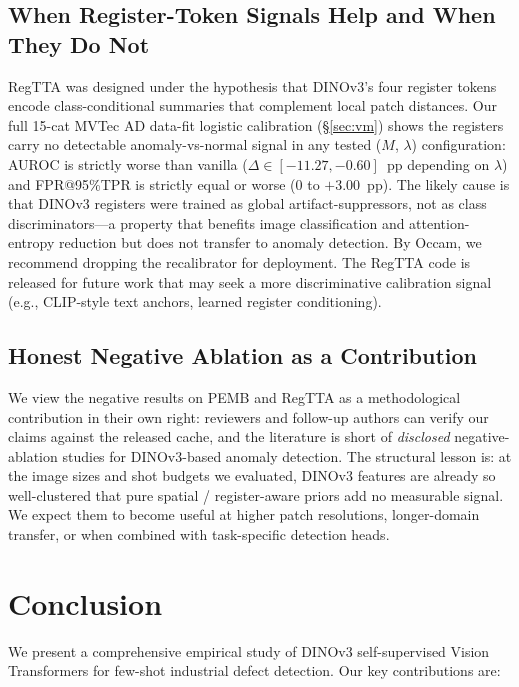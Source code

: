 \documentclass[journal]{IEEEtran}
\begin{document}
\subsection{When Register-Token Signals Help and When They Do Not}
\label{sec:disc-regtta}
RegTTA was designed under the hypothesis that DINOv3's four register tokens encode class-conditional summaries that complement local patch distances. Our full 15-cat MVTec AD data-fit logistic calibration (\S\ref{sec:vm}) shows the registers carry no detectable anomaly-vs-normal signal in any tested ($M$, $\lambda$) configuration: AUROC is strictly worse than vanilla ($\Delta \in [-11.27, -0.60]$~pp depending on $\lambda$) and FPR@95\%TPR is strictly equal or worse ($0$ to $+3.00$~pp). The likely cause is that DINOv3 registers were trained as global artifact-suppressors, not as class discriminators---a property that benefits image classification and attention-entropy reduction but does not transfer to anomaly detection. By Occam, we recommend dropping the recalibrator for deployment. The RegTTA code is released for future work that may seek a more discriminative calibration signal (e.g., CLIP-style text anchors, learned register conditioning).

\subsection{Honest Negative Ablation as a Contribution}
\label{sec:honest-negative-contrib}
We view the negative results on PEMB and RegTTA as a methodological contribution in their own right: reviewers and follow-up authors can verify our claims against the released cache, and the literature is short of \emph{disclosed} negative-ablation studies for DINOv3-based anomaly detection. The structural lesson is: at the image sizes and shot budgets we evaluated, DINOv3 features are already so well-clustered that pure spatial / register-aware priors add no measurable signal. We expect them to become useful at higher patch resolutions, longer-domain transfer, or when combined with task-specific detection heads.

\section{Conclusion}
We present a comprehensive empirical study of DINOv3 self-supervised Vision Transformers for few-shot industrial defect detection. Our key contributions are:
\end{document}
